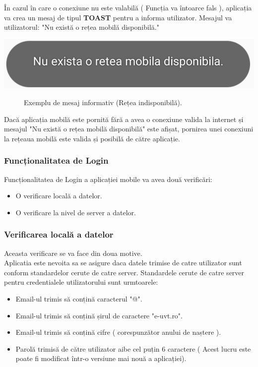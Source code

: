 \documentclass{article}
\begin{document}
	În cazul în care o conexiune nu este valabilă ( Funcția va întoarce fals ), aplicația va crea un mesaj de tipul \textbf{TOAST} pentru a informa utilizator. Mesajul va utilizatorul: "Nu există o rețea mobilă disponibilă."

	\begin{center}
		\includegraphics[scale=0.25]{Source/AplicatieRetea}
		\begin{figure}[!h]
			{\caption*{Exemplu de mesaj informativ (Rețea indisponibilă).}}
		\end{figure}
	\end{center}

	Dacă aplicația mobilă este pornită fără a avea o conexiune valida la internet și mesajul "Nu există o rețea mobilă disponibilă" este afișat, pornirea unei conexiuni la rețeaua mobilă este valida și posibilă de către aplicație.

			\subsubsection{Funcționalitatea de Login}

 	 Funcționalitatea de Login a aplicației mobile va avea două verificări:
	\begin{itemize}
		\item O verificare locală a datelor.
		\item O verificare la nivel de server a datelor.
	\end{itemize}

		\subsubsection*{Verificarea locală a datelor}
		Aceasta verificare se va face din doua motive. \\
		Aplicatia este nevoita sa se asigure daca datele trimise de catre utilizator sunt conform standardelor cerute de catre server. Standardele cerute de catre server pentru credentialele utilizatorului sunt urmtoarele:
	\begin{itemize}
		\item Email-ul trimis să conțină caracterul "@".
		\item Email-ul trimis să conțină șirul de caractere "e-uvt.ro".
		\item Email-ul trimis să conțină cifre ( corespunzător anului de naștere ).
  		\item Parolă trimisă de către utilizator aibe cel puțin 6 caractere ( Acest lucru este poate fi modificat într-o versiune mai nouă a aplicației).
	\end{itemize} \label{Credentiale}
\end{document}
